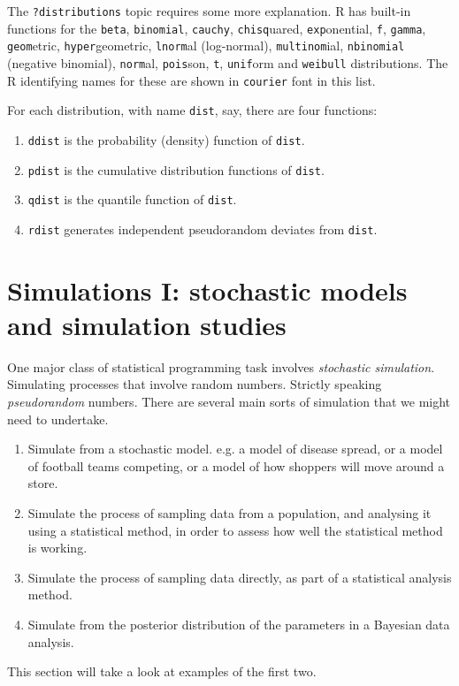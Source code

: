 \documentclass[10pt] {article}
\theoremstyle{definition}
\begin{document}
The {\lstinline+?distributions+} topic requires some more explanation. R has built-in functions for the {\lstinline+beta+}, {\lstinline+binomial+}, {\lstinline+cauchy+}, {\lstinline+chisq+}uared, {\lstinline+exp+}onential, {\lstinline+f+}, {\lstinline+gamma+}, {\lstinline+geom+}etric, {\lstinline+hyper+}geometric, {\lstinline+lnorm+}al (log-normal), {\lstinline+multinom+}ial, {\lstinline+nbinomial+} (negative binomial), {\lstinline+norm+}al, {\lstinline+pois+}son, {\lstinline+t+}, {\lstinline+unif+}orm and {\lstinline+weibull+} distributions. The R identifying names for these are shown in {\lstinline+courier+} font in this list. 

For each distribution, with name {\lstinline+dist+}, say, there are four functions:
\begin{enumerate}
\item {\lstinline+ddist+} is the probability (density) function of {\lstinline+dist+}.
\item {\lstinline+pdist+} is the cumulative distribution functions of {\lstinline+dist+}.
\item {\lstinline+qdist+} is the quantile function of {\lstinline+dist+}.
\item {\lstinline+rdist+} generates independent pseudorandom deviates from {\lstinline+dist+}. 
\end{enumerate}

\section{Simulations I: stochastic models and simulation studies \label{sec:sim1}}

One major class of statistical programming task involves {\em stochastic simulation}. Simulating processes that involve random numbers. Strictly speaking {\em pseudorandom} numbers. There are several main sorts of simulation that we might need to undertake.
\begin{enumerate}
\item Simulate from a stochastic model. e.g. a model of disease spread, or a model of football teams competing, or a model of how shoppers will move around a store.
\item Simulate the process of sampling data from a population, and analysing it using a statistical method, in order to assess how well the statistical method is working. 
\item Simulate the process of sampling data directly, as part of a statistical analysis method.
\item Simulate from the posterior distribution of the parameters in a Bayesian data analysis.
\end{enumerate}  
This section will take a look at examples of the first two. 
\end{document}
